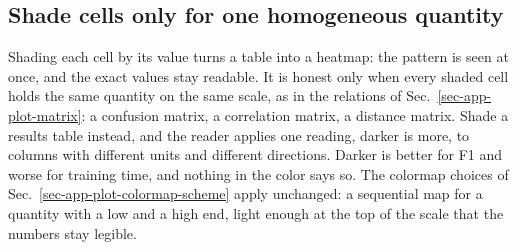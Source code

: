 \FloatBarrier
\subsection{Shade cells only for one homogeneous quantity}\label{sec-app-table-shade}

Shading each cell by its value turns a table into a heatmap: the pattern is seen at once, and the exact values stay readable. It is honest only when every shaded cell holds the same quantity on the same scale, as in the relations of Sec.~\ref{sec-app-plot-matrix}: a confusion matrix, a correlation matrix, a distance matrix. Shade a results table instead, and the reader applies one reading, darker is more, to columns with different units and different directions. Darker is better for F1 and worse for training time, and nothing in the color says so. The colormap choices of Sec.~\ref{sec-app-plot-colormap-scheme} apply unchanged: a sequential map for a quantity with a low and a high end, light enough at the top of the scale that the numbers stay legible.

